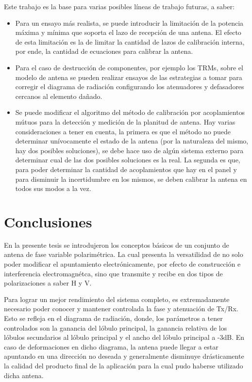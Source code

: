 Este trabajo es la base para varias posibles líneas de trabajo futuras, a saber:
\begin{itemize}
	\item Para un ensayo más realista, se puede introducir la limitación de la potencia máxima y mínima que soporta el lazo 
		de recepción de una antena. El efecto de esta limitación es la de limitar la cantidad de lazos de calibración interna, 
		por ende, la cantidad de ecuaciones para calibrar la antena.
	\item Para el caso de destrucción de componentes, por ejemplo los TRMs, sobre el modelo de antena se pueden realizar ensayos 
		de las estrategias a tomar para corregir el diagrama de radiación configurando los atenuadores y defasadores cercanos al 
		elemento dañado.
	\item Se puede modificar el algoritmo del método de calibración por acoplamientos mútuos para la detección y medición de 
		la planitud de antena. Hay varias consideraciones a tener en cuenta, la primera es que el método no puede determinar 
		unívocamente el estado de la antena (por la naturaleza del mismo, hay dos posibles soluciones), se debe hace uso de algún 
		sistema externo para determinar cual de las dos posibles soluciones es la real. La segunda es que, para poder determinar
		la cantidad de acoplamientos que hay en el panel y para disminuir la incertidumbre en los mismos, se deben calibrar la 
		antena en todos sus modos a la vez.
\end{itemize}

\section{Conclusiones}

En la presente tesis se introdujeron los conceptos básicos de un conjunto de antena de fase variable polarimétrica. La cual 
presenta la versatilidad de no solo poder modificar el apuntamiento electrónicamente, por efecto de construcción e interferencia 
electromagnétca, sino que transmite y recibe en dos tipos de polarizaciones a saber H y V.

Para lograr un mejor rendimiento del sistema completo, es extremadamente necesario poder conocer y mantener controlada la fase 
y atenuación de Tx/Rx. Esto se refleja en el diagrama de radiación, donde, los parámetros a tener controlados son la ganancia
del lóbulo principal, la ganancia relativa de los lóbulos secundarios al lóbulo principal y el ancho del lóbulo principal a 
-3dB. En caso de deformaciones en dicho diagrama, la antena puede llegar a estar apuntando en una dirección no deseada y 
generalmente disminuye drásticamente la calidad del producto final de la aplicación para la cual pudo haberse utilizado dicha 
antena.

